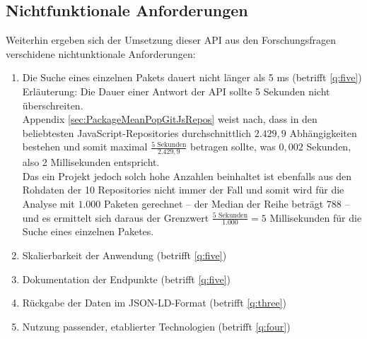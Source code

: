 \subsection{Nichtfunktionale Anforderungen} \label{sec:N_Anforderungen}
    Weiterhin ergeben sich der Umsetzung dieser \ac{API} aus den Forschungsfragen verschidene nichtunktionale Anforderungen:
    \begin{enumerate}[label=\textbf{NFRQ-\Roman*}, leftmargin=2.5cm]
        \item Die Suche eines einzelnen Pakets dauert nicht länger als 5 ms (betrifft \ref{q:five}) \label{nf:one}
        \\
        Erläuterung:
        Die Dauer einer Antwort der API sollte 5 Sekunden nicht überschreiten.\textsuperscript{\cite{link:ApiResponseTime}}
        \\
        Appendix \ref{sec:PackageMeanPopGitJsRepos} weist nach, dass in den beliebtesten JavaScript-Repositories durchschnittlich $2.429,9$ Abhängigkeiten bestehen und somit maximal $\frac{5\text{ Sekunden}}{2.429,9}$ betragen sollte, was $0,002$ Sekunden, also 2 Millisekunden entspricht.
        \\
        Das ein Projekt jedoch solch hohe Anzahlen beinhaltet ist ebenfalls aus den Rohdaten der 10 Repositories nicht immer der Fall und somit wird für die Analyse mit $1.000$ Paketen gerechnet -- der Median der Reihe beträgt $788$ -- und es ermittelt sich daraus der Grenzwert $\frac{5\text{ Sekunden}}{1.000} = 5$ Millisekunden für die Suche eines einzelnen Paketes.
        \item Skalierbarkeit der Anwendung (betrifft \ref{q:five}) \label{nf:two}
        \item Dokumentation der Endpunkte (betrifft \ref{q:five}) \label{nf:three}
        \item Rückgabe der Daten im \acs{JSON-LD}-Format (betrifft \ref{q:three}) \label{nf:four}
        \item Nutzung passender, etablierter Technologien (betrifft \ref{q:four}) \label{nf:five}
    \end{enumerate}